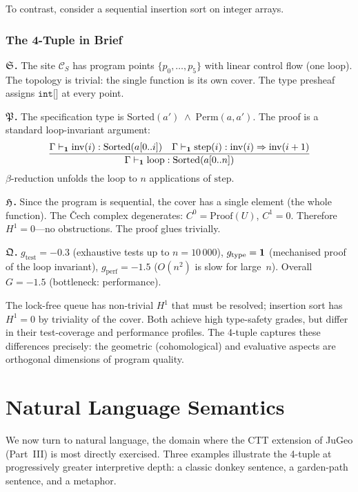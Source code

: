 To contrast, consider a sequential insertion sort on integer arrays.

\subsection{The 4-Tuple in Brief}

\textbf{$\mathfrak{S}$.}\quad
The site $\mathcal{C}_S$ has program points
$\{p_0,\ldots,p_5\}$ with linear control flow (one loop).  The
topology is trivial: the single function is its own cover.
The type presheaf assigns $\texttt{int[]}$ at every point.

\textbf{$\mathfrak{P}$.}\quad
The specification type is
$\mathrm{Sorted}(a') \;\wedge\; \mathrm{Perm}(a,a')$.
The proof is a standard loop-invariant argument:
\[
  \dfrac{
    \Gamma\vdash_{\mathbf{1}}
      \mathrm{inv}(i):\mathrm{Sorted}(a[0..i])
    \quad
    \Gamma\vdash_{\mathbf{1}}
      \mathrm{step}(i):\mathrm{inv}(i)\Rightarrow\mathrm{inv}(i+1)
  }{
    \Gamma\vdash_{\mathbf{1}}
      \mathrm{loop}:\mathrm{Sorted}(a[0..n])
  }
\]
$\beta$-reduction unfolds the loop to $n$ applications of
$\mathrm{step}$.

\textbf{$\mathfrak{H}$.}\quad
Since the program is sequential, the cover has a single element
(the whole function).  The \v{C}ech complex degenerates:
$C^0=\mathrm{Proof}(U)$, $C^1=0$.  Therefore $H^1=0$---no
obstructions.  The proof glues trivially.

\textbf{$\mathfrak{Q}$.}\quad
$g_{\mathrm{test}}=-0.3$ (exhaustive tests up to $n=10\,000$),
$g_{\mathrm{type}}=\mathbf{1}$ (mechanised proof of the loop invariant),
$g_{\mathrm{perf}}=-1.5$ ($O(n^2)$ is slow for large~$n$).
Overall $G=-1.5$ (bottleneck: performance).

\begin{remark}
The lock-free queue has non-trivial $H^1$ that must be resolved;
insertion sort has $H^1=0$ by triviality of the cover.  Both
achieve high type-safety grades, but differ in their test-coverage
and performance profiles.  The 4-tuple captures these differences
precisely: the geometric (cohomological) and evaluative aspects
are orthogonal dimensions of program quality.
\end{remark}

\chapter{Natural Language Semantics}
\label{ch:ex-nl}

We now turn to natural language, the domain where the CTT extension
of JuGeo (Part~III) is most directly exercised.  Three examples
illustrate the 4-tuple at progressively greater interpretive depth:
a classic donkey sentence, a garden-path sentence, and a metaphor.

